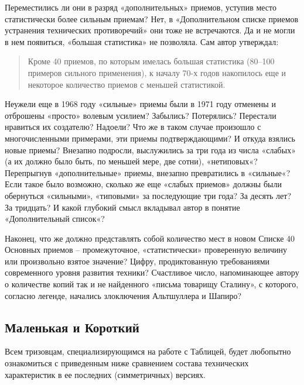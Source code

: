 \documentclass[11pt,a4paper]{article}
\begin{document}
Переместились ли они в разряд «дополнительных» приемов, уступив место
статистически более сильным приемам? Нет, в «Дополнительном списке приемов
устранения технических противоречий» они тоже не встречаются. Да и не могли в
нем появиться, «большая статистика» не позволяла. Сам автор утверждал:
\begin{quote}
  Кроме 40 приемов, по которым имелась большая статистика (80--100 примеров
  сильного применения), к началу 70-х годов накопилось еще и некоторое
  количество приемов с меньшей статистикой.  \cite{Altshuller1973a}
\end{quote}
Неужели еще в 1968 году «сильные» приемы были в 1971 году отменены и отброшены
«просто» волевым усилием? Забылись? Потерялись? Перестали нравиться их
создателю? Надоели? Что же в таком случае произошло с многочисленными
примерами, эти приемы подтверждающими? И откуда взялись новые приемы? Внезапно
подросли, выслужились за три года из числа «слабых» (а их должно было быть, по
меньшей мере, две сотни), «нетиповых«? Перепрыгнув «дополнительные» приемы,
внезапно превратились в «сильные«? Если такое было возможно, сколько же еще
«слабых приемов» должны были обернуться «сильными», «типовыми» за последующие
три года? За десять лет? За тридцать? И какой глубокий смысл вкладывал автор в
понятие «Дополнительный список«?

Наконец, что же должно представлять собой количество мест в новом Списке 40
Основных приемов -- промежуточное, «статистически» проверенную величину или
произвольно взятое значение? Цифру, продиктованную требованиями современного
уровня развития техники? Счастливое число, напоминающее автору о количестве
копий так и не найденного «письма товарищу Сталину», с которого, согласно
легенде, начались злоключения Альтшуллера и Шапиро?

\subsection*{Маленькая и Короткий}

Всем тризовцам, специализирующимся на работе с Таблицей, будет любопытно
ознакомиться с приведенным ниже сравнением состава технических характеристик в
ее последних (симметричных) версиях.
\end{document}
